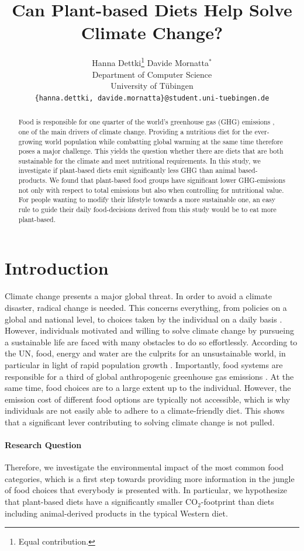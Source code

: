 \documentclass{article}
\title{Can Plant-based Diets Help Solve Climate Change?}
\author{%
  Hanna Dettki\thanks{Equal contribution.}\hspace{4em} Davide Mornatta$^{*}$  \\[0.5em]
  Department of Computer Science\\
  University of Tübingen\\
  \texttt{\{hanna.dettki, davide.mornatta\}@student.uni-tuebingen.de}
}
\begin{document}
\maketitle

\begin{abstract}
  Food is responsible for one quarter of the world's greenhouse gas (GHG) emissions \cite{Poore2018}, one of the main drivers of climate change. Providing a nutritious diet for the ever-growing world population while combatting global warming at the same time therefore poses a major challenge. This yields the question whether there are diets that are both sustainable for the climate and meet  nutritional requirements. In this study, we investigate if plant-based diets  emit significantly less GHG than animal based-products. We found  that plant-based food groups have significant lower GHG-emissions not only with respect to total emissions but also when controlling for nutritional value. For people wanting to  modify their lifestyle towards a more sustainable one, an easy rule to guide their daily food-decisions derived from this study would be to eat more plant-based.
\end{abstract}

\section{Introduction}

Climate change presents a major global threat. In order to avoid a climate disaster, radical change is needed. This concerns everything, from policies on a global and national level, to choices taken by the individual on a daily basis \cite{IPCC}. 
However, individuals motivated and willing to solve climate change by pursueing a sustainable life are faced with many obstacles to do so effortlessly. According to the UN, food, energy and water are the culprits for an unsustainable world, in particular in light of rapid population growth \cite{Ritchie2020}.
 Importantly, food systems are responsible for a third of global anthropogenic greenhouse gas emissions \cite{Crippa2021}. At the same time, food choices are to a large extent up to the individual.  However,  the emission cost of different food options are  typically not accessible, which is why individuals are  not easily able to adhere to  a climate-friendly diet. This shows that a significant lever contributing to solving climate change is not pulled.
\paragraph*{Research Question}
Therefore, we investigate the environmental impact of the most common food categories, which is a first step towards  providing more information in the jungle of food choices that everybody is presented with. In particular, we hypothesize that  plant-based diets  have a significantly smaller CO$_2$-footprint than  diets including animal-derived products in the typical Western diet.
\end{document}
